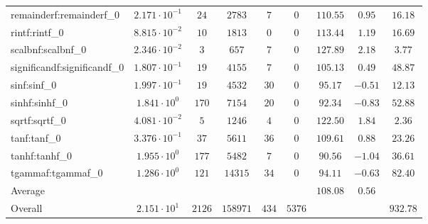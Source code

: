 \begin{tabular}{|l|c|c|c|c|c|c|c|c|}
remainderf:remainderf\_0     & $ 2.171 \cdot 10^{-1} $ & $ 24     $ & $ 2783   $ & $ 7   $ & $ 0    $ & $ 110.55      $ & $ 0.95    $ & $ 16.18   $ \\
rintf:rintf\_0               & $ 8.815 \cdot 10^{-2} $ & $ 10     $ & $ 1813   $ & $ 0   $ & $ 0    $ & $ 113.44      $ & $ 1.19    $ & $ 16.69   $ \\
scalbnf:scalbnf\_0           & $ 2.346 \cdot 10^{-2} $ & $ 3      $ & $ 657    $ & $ 7   $ & $ 0    $ & $ 127.89      $ & $ 2.18    $ & $ 3.77    $ \\
significandf:significandf\_0 & $ 1.807 \cdot 10^{-1} $ & $ 19     $ & $ 4155   $ & $ 7   $ & $ 0    $ & $ 105.13      $ & $ 0.49    $ & $ 48.87   $ \\
sinf:sinf\_0                 & $ 1.997 \cdot 10^{-1} $ & $ 19     $ & $ 4532   $ & $ 30  $ & $ 0    $ & $ 95.17       $ & $ -0.51   $ & $ 12.13   $ \\
sinhf:sinhf\_0               & $ 1.841 \cdot 10^{0}  $ & $ 170    $ & $ 7154   $ & $ 20  $ & $ 0    $ & $ 92.34       $ & $ -0.83   $ & $ 52.88   $ \\
sqrtf:sqrtf\_0               & $ 4.081 \cdot 10^{-2} $ & $ 5      $ & $ 1246   $ & $ 4   $ & $ 0    $ & $ 122.50      $ & $ 1.84    $ & $ 2.36    $ \\
tanf:tanf\_0                 & $ 3.376 \cdot 10^{-1} $ & $ 37     $ & $ 5611   $ & $ 36  $ & $ 0    $ & $ 109.61      $ & $ 0.88    $ & $ 23.26   $ \\
tanhf:tanhf\_0               & $ 1.955 \cdot 10^{0}  $ & $ 177    $ & $ 5482   $ & $ 7   $ & $ 0    $ & $ 90.56       $ & $ -1.04   $ & $ 36.61   $ \\
tgammaf:tgammaf\_0           & $ 1.286 \cdot 10^{0}  $ & $ 121    $ & $ 14315  $ & $ 34  $ & $ 0    $ & $ 94.11       $ & $ -0.63   $ & $ 82.40   $ \\
\hline
Average                      & $                     $ & $        $ & $        $ & $     $ & $      $ & $ 108.08      $ & $ 0.56    $ & $         $ \\
\hline
Overall                      & $ 2.151 \cdot 10^{1}  $ & $ 2126   $ & $ 158971 $ & $ 434 $ & $ 5376 $ & $             $ & $         $ & $ 932.78  $ \\
\hline
\end{tabular}
